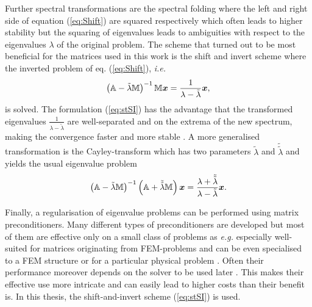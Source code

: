 Further spectral transformations are the spectral folding \cite{slepcManual} where the left and right side of equation (\ref{eq:Shift}) are squared respectively which often leads to higher stability but the squaring of eigenvalues leads to ambiguities with respect to the eigenvalues $\lambda$ of the original problem.
The scheme that turned out to be most beneficial for the matrices used in this work is the shift and invert scheme where the inverted problem of eq. (\ref{eq:Shift}), \textit{i.e.}
\begin{equation}\label{eq:stSI}
\left(\mathbb{A}-\tilde{\lambda}\mathbb{M}\right)^{-1}\mathbb{M}\bm{x}=\frac{1}{\lambda-\tilde{\lambda}}\bm{x},
\end{equation}
is solved. 
The formulation (\ref{eq:stSI}) has the advantage that the transformed eigenvalues $\frac{1}{\lambda-\tilde{\lambda}}$ are well-separated and on the extrema of the new spectrum, making the convergence faster and more stable \cite{str-7}.
A more generalised transformation is the Cayley-transform which has two parameters $\tilde{\lambda}$ and $\tilde{\tilde{\lambda}}$ and yields the usual eigenvalue problem
\begin{equation}
\left(\mathbb{A}-\tilde{\lambda}\mathbb{M}\right)^{-1}\left(\mathbb{A}+\tilde{\tilde{\lambda}}\mathbb{M}\right)\bm{x}=\frac{\lambda+\tilde{\tilde{\lambda}}}{\lambda-\tilde{\lambda}}\bm{x}.
\end{equation}

Finally, a regularisation of eigenvalue problems can be performed using matrix preconditioners.
Many different types of preconditioners are developed \cite{Helmke2010} but most of them are effective only on a small class of problems as \textit{e.g.} especially well-suited for matrices originating from FEM-problems \cite{PrecFem, PrecFem2} and can be even specialised to a FEM structure \cite{MultPrec,MultPrec2} or for a particular physical problem \cite{HelmhPrec}. 
Often their performance moreover depends on the solver to be used later \cite{PrecKr}.
This makes their effective use more intricate and can easily lead to higher costs than their benefit is.
In this thesis, the shift-and-invert scheme (\ref{eq:stSI}) is used.

